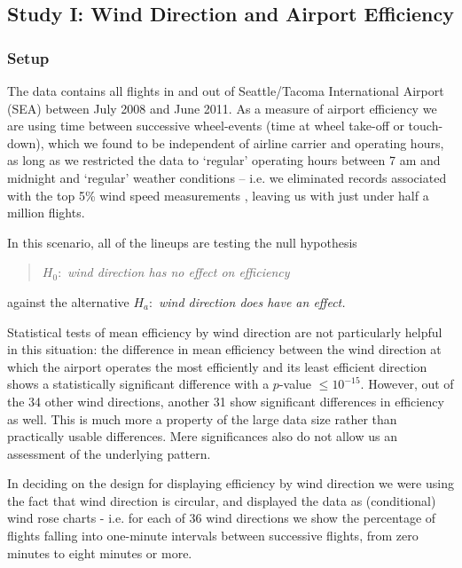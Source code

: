 \subsection{Study I: Wind Direction and Airport Efficiency}
\subsubsection{Setup}
The data contains all flights \cite{rita} in and out of Seattle/Tacoma International Airport (SEA) between July 2008 and June 2011. As a measure of airport efficiency we are using time between successive wheel-events (time at wheel take-off or touch-down), which we found to be independent of airline carrier and operating hours, as long as we restricted the data to `regular' operating hours between 7 am and midnight and `regular' weather conditions -- i.e. we eliminated records associated with the top 5\% wind speed measurements \cite{noaa-weather}, leaving us with just under half a million flights.

In this scenario, all of the lineups are testing the null hypothesis 

\vspace{-0.1in}
\begin{quote}
$H_0: $ {\em wind direction has no effect on efficiency }
\end{quote}
\vspace{-0.1in}

\noindent against the alternative $H_a:$ {\em wind direction does have an effect.}

Statistical tests of mean efficiency by wind direction are not particularly helpful in this situation: the difference in mean efficiency between the  wind direction at which the airport operates the most efficiently and its least efficient direction shows a statistically significant difference with a $p$-value $\le 10^{-15}$. %
However, out of the 34 other wind directions,  another 31 show significant differences in efficiency as well. This is much more a property of the large data size rather than practically usable differences. Mere significances also do not allow us an assessment of the underlying pattern.

In deciding on the design for displaying efficiency by wind direction we were using the fact that wind direction is circular, and  displayed the data as (conditional) wind rose charts - i.e. for each of 36 wind directions we show the percentage of flights falling into one-minute intervals between successive flights, from  zero minutes to eight minutes or more.

